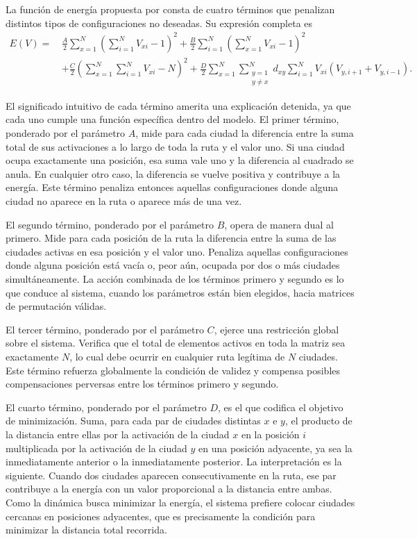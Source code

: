 \documentclass[12pt,a4paper]{article}
\begin{document}
La función de energía propuesta por \textcite{HopfieldTank1985} consta de cuatro términos que penalizan distintos tipos de configuraciones no deseadas. Su expresión completa es
\begin{equation}
\label{eq:energia}
\begin{aligned}
E(V) = \, & \frac{A}{2} \sum_{x=1}^{N} \left( \sum_{i=1}^{N} V_{xi} - 1 \right)^{\!2} + \frac{B}{2} \sum_{i=1}^{N} \left( \sum_{x=1}^{N} V_{xi} - 1 \right)^{\!2} \\
& + \frac{C}{2} \left( \sum_{x=1}^{N} \sum_{i=1}^{N} V_{xi} - N \right)^{\!2} + \frac{D}{2} \sum_{x=1}^{N} \sum_{\substack{y=1 \\ y \neq x}}^{N} d_{xy} \sum_{i=1}^{N} V_{xi} \left( V_{y,i+1} + V_{y,i-1} \right).
\end{aligned}
\end{equation}

El significado intuitivo de cada término amerita una explicación detenida, ya que cada uno cumple una función específica dentro del modelo. El primer término, ponderado por el parámetro $A$, mide para cada ciudad la diferencia entre la suma total de sus activaciones a lo largo de toda la ruta y el valor uno. Si una ciudad ocupa exactamente una posición, esa suma vale uno y la diferencia al cuadrado se anula. En cualquier otro caso, la diferencia se vuelve positiva y contribuye a la energía. Este término penaliza entonces aquellas configuraciones donde alguna ciudad no aparece en la ruta o aparece más de una vez.

El segundo término, ponderado por el parámetro $B$, opera de manera dual al primero. Mide para cada posición de la ruta la diferencia entre la suma de las ciudades activas en esa posición y el valor uno. Penaliza aquellas configuraciones donde alguna posición está vacía o, peor aún, ocupada por dos o más ciudades simultáneamente. La acción combinada de los términos primero y segundo es lo que conduce al sistema, cuando los parámetros están bien elegidos, hacia matrices de permutación válidas.

El tercer término, ponderado por el parámetro $C$, ejerce una restricción global sobre el sistema. Verifica que el total de elementos activos en toda la matriz sea exactamente $N$, lo cual debe ocurrir en cualquier ruta legítima de $N$ ciudades. Este término refuerza globalmente la condición de validez y compensa posibles compensaciones perversas entre los términos primero y segundo.

El cuarto término, ponderado por el parámetro $D$, es el que codifica el objetivo de minimización. Suma, para cada par de ciudades distintas $x$ e $y$, el producto de la distancia entre ellas por la activación de la ciudad $x$ en la posición $i$ multiplicada por la activación de la ciudad $y$ en una posición adyacente, ya sea la inmediatamente anterior o la inmediatamente posterior. La interpretación es la siguiente. Cuando dos ciudades aparecen consecutivamente en la ruta, ese par contribuye a la energía con un valor proporcional a la distancia entre ambas. Como la dinámica busca minimizar la energía, el sistema prefiere colocar ciudades cercanas en posiciones adyacentes, que es precisamente la condición para minimizar la distancia total recorrida.
\end{document}
